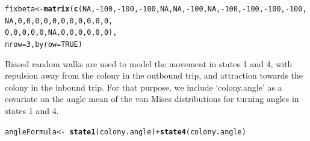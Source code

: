 \documentclass[12pt]{article}\usepackage[]{graphicx}\usepackage[]{xcolor}
\makeatletter
\newcommand{\hlnum}[1]{\textcolor[rgb]{0.686,0.059,0.569}{#1}}%
\newcommand{\hlopt}[1]{\textcolor[rgb]{0,0,0}{#1}}%
\newcommand{\hldef}[1]{\textcolor[rgb]{0.345,0.345,0.345}{#1}}%
\newcommand{\hlkwb}[1]{\textcolor[rgb]{0.69,0.353,0.396}{#1}}%
\newcommand{\hlkwc}[1]{\textcolor[rgb]{0.333,0.667,0.333}{#1}}%
\newcommand{\hlkwd}[1]{\textcolor[rgb]{0.737,0.353,0.396}{\textbf{#1}}}%
\newenvironment{kframe}{%
 \def\at@end@of@kframe{}%
 \ifinner\ifhmode%
  \def\at@end@of@kframe{\end{minipage}}%
  \begin{minipage}{\columnwidth}%
 \fi\fi%
 \def\FrameCommand##1{\hskip\@totalleftmargin \hskip-\fboxsep
 \colorbox{shadecolor}{##1}\hskip-\fboxsep
     \hskip-\linewidth \hskip-\@totalleftmargin \hskip\columnwidth}%
 \MakeFramed {\advance\hsize-\width
   \@totalleftmargin\z@ \linewidth\hsize
   \@setminipage}}%
 {\par\unskip\endMakeFramed%
 \at@end@of@kframe}
\newenvironment{knitrout}{}{} %
\makeatother
\begin{document}
\begin{knitrout}
\color{fgcolor}\begin{kframe}
\begin{alltt}
\hldef{fixbeta} \hlkwb{<-} \hlkwd{matrix}\hldef{(}\hlkwd{c}\hldef{(}\hlnum{NA}\hldef{,}\hlopt{-}\hlnum{100}\hldef{,}\hlopt{-}\hlnum{100}\hldef{,}\hlopt{-}\hlnum{100}\hldef{,}\hlnum{NA}\hldef{,}\hlnum{NA}\hldef{,}\hlopt{-}\hlnum{100}\hldef{,}\hlnum{NA}\hldef{,}\hlopt{-}\hlnum{100}\hldef{,}\hlopt{-}\hlnum{100}\hldef{,}\hlopt{-}\hlnum{100}\hldef{,}\hlopt{-}\hlnum{100}\hldef{,}
                    \hlnum{NA}\hldef{,}   \hlnum{0}\hldef{,}   \hlnum{0}\hldef{,}   \hlnum{0}\hldef{,} \hlnum{0}\hldef{,} \hlnum{0}\hldef{,}   \hlnum{0}\hldef{,} \hlnum{0}\hldef{,}   \hlnum{0}\hldef{,}   \hlnum{0}\hldef{,}   \hlnum{0}\hldef{,}   \hlnum{0}\hldef{,}
                     \hlnum{0}\hldef{,}   \hlnum{0}\hldef{,}   \hlnum{0}\hldef{,}   \hlnum{0}\hldef{,} \hlnum{0}\hldef{,}\hlnum{NA}\hldef{,}   \hlnum{0}\hldef{,} \hlnum{0}\hldef{,}   \hlnum{0}\hldef{,}   \hlnum{0}\hldef{,}   \hlnum{0}\hldef{,}   \hlnum{0}\hldef{),}
                  \hlkwc{nrow}\hldef{=}\hlnum{3}\hldef{,}\hlkwc{byrow}\hldef{=}\hlnum{TRUE}\hldef{)}
\end{alltt}
\end{kframe}
\end{knitrout}

Biased random walks are used to model the movement in states 1 and 4, with repulsion away from the colony in the outbound trip, and attraction towards the colony in the inbound trip. For that purpose, we include `colony.angle' as a covariate on the angle mean of the von Mises distributions for turning angles in states 1 and 4. 

\begin{knitrout}
\color{fgcolor}\begin{kframe}
\begin{alltt}
\hldef{angleFormula} \hlkwb{<-} \hlopt{~} \hlkwd{state1}\hldef{(colony.angle)} \hlopt{+} \hlkwd{state4}\hldef{(colony.angle)}
\end{alltt}
\end{kframe}
\end{knitrout}
\end{document}
